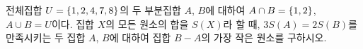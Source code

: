 전체집합 $U=\{1{,}\mkern3mu\mathopen{}2{,}\mkern3mu\mathopen{}4{,}\mkern3mu\mathopen{}7{,}\mkern3mu\mathopen{}8\}$의 두 부분집합 $A$, $B$에 대하여 $A\cap B=\{1{,}\mkern3mu\mathopen{}2\}$, $A\cup B=U$이다. 집합 $X$의 모든 원소의 합을 $S(X)$라 할 때, $3S(A)=2S(B)$를 만족시키는 두 집합 $A$, $B$에 대하여 집합 $B-A$의 가장 작은 원소를 구하시오.
